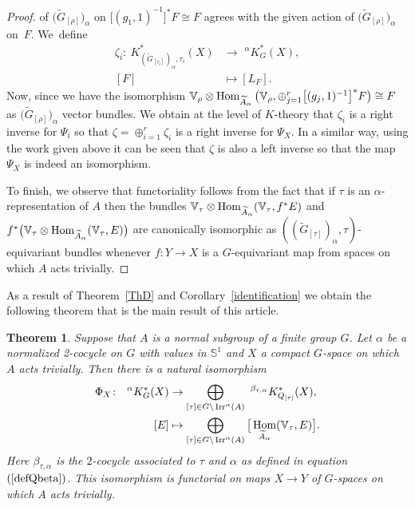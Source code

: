\documentclass[10pt,a4paper]{amsart}
\def\S{\mathbb{S}}
\def\V{\mathbb{V}}
\DeclareMathOperator{\Hom}{\textup{Hom}}
\DeclareMathOperator{\Irr}{\textup{Irr}}
\newtheorem{Th}{Theorem}[section]
\theoremstyle{definition}
\numberwithin{equation}{section}
\begin{document}
\begin{proof}
of $\big(\widetilde{G}_{[\rho]}\big)_{\alpha}$ on $\big[(g_{1},1)^{-1}\big]^{\ast} F\cong F$ agrees with
the given action of $\big(\widetilde{G}_{[\rho]}\big)_{\alpha}$ on~$F$. We~define
\begin{align*}
\zeta_{i}\colon\ K^{*}_{\left(\widetilde{G}_{[\tau_{i}]}\right)_{\alpha},\tau_{i}}(X)
&\rightarrow \phantom{i}^{\alpha}K_{G}^{\ast}(X),
\\
[F]&\mapsto [L_{F}].
\end{align*}
Now, since we have the isomorphism
$\V_{\rho}\otimes \Hom_{\widetilde{A}_{\alpha}}
\big(\V_{\rho},\oplus_{j=1}^{r}\big[(g_{j},1)^{-1}\big]^{\ast} F\big)\cong F$ as
$\big(\widetilde{G}_[\rho]\big)_{\alpha}$ vector bundles. We obtain at the level of $K$-theory that
$\zeta_{i}$ is a right inverse for $\Psi_{i}$ so that
$\zeta=\oplus_{i=1}^{r}\zeta_{i}$ is a right inverse for $\Psi_{X}$. In a similar way, using the
work given above it can be seen that $\zeta$ is also a left inverse so that the
map $\Psi_{X}$ is indeed an isomorphism.

To finish, we observe that functoriality follows from the fact that if $\tau$ is an
$\alpha$-representation of $A$ then the bundles
$\V_{\tau}\otimes \Hom_{\widetilde{A}_{\alpha}}(\V_{\tau},f^{\ast} E)$ and
$f^{\ast}\big(\V_{\tau}\otimes \Hom_{\widetilde{A}_{\alpha}}(\V_{\tau},E)\big)$
are canonically isomorphic as $((\widetilde{G}_{[\tau]})_{\alpha},\tau)$-equivariant bundles
whenever $f\colon Y\rightarrow X$ is a
$G$-equivariant map from spaces on which $A$ acts trivially.
\end{proof}


As a result of Theorem~\ref{ThD} and Corollary~\ref{identification} we obtain the following
theorem that is the main result of this article.


\begin{Th}\label{Thmain}
Suppose that $A$ is a normal subgroup of a finite group $G$. Let $\alpha$
be a normalized 2-cocycle on $G$ with values in $\S^{1}$ and $X$ a
compact $G$-space on which $A$ acts trivially.
Then there is a natural isomorphism
\begin{align*}
\Phi_{X}\colon\ \phantom{i}^{\alpha}K_{G}^{\ast}(X)&\rightarrow
\bigoplus_{[\tau]\in G\backslash \Irr^{\alpha}(A)}\phantom{i}
^{\beta_{\tau,\alpha}}K^{\ast}_{Q_{[\tau]}}(X),
\\
[E]&\mapsto \bigoplus_{[\tau]\in G\backslash \Irr^{\alpha}(A)}
\big[\Hom_{\widetilde{A}_{\alpha}}(\V_{\tau},E)\big].
\end{align*}
Here $\beta_{\tau,\alpha}$ is the $2$-cocycle associated to $\tau$ and $\alpha$ as defined in equation~$(\ref{defQbeta})$. This isomorphism is functorial on maps $X\rightarrow Y$ of
$G$-spaces on which $A$ acts trivially.
\end{Th}
\end{document}
